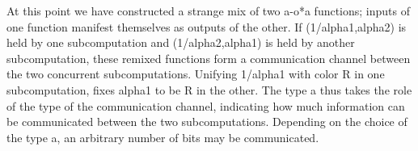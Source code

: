 \documentclass[preprint]{sigplanconf}
\begin{document}
\begin{itemize}
\end{itemize}

At this point we have constructed a strange mix of two {{a-o*a}} functions;
inputs of one function manifest themselves as outputs of the other. If
{{(1/alpha1,alpha2)}} is held by one subcomputation and {{(1/alpha2,alpha1)}}
is held by another subcomputation, these remixed functions form a
communication channel between the two concurrent subcomputations. Unifying
{{1/alpha1}} with {{color}} {{R}} in one subcomputation, fixes {{alpha1}} to
be {{R}} in the other. The type {{a}} thus takes the role of the type of the
communication channel, indicating how much information can be communicated
between the two subcomputations.  Depending on the choice of the type {{a}},
an arbitrary number of bits may be communicated.
\end{document}
